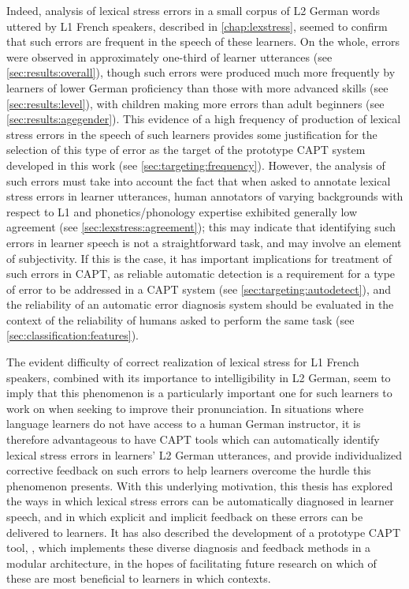  
 Indeed, analysis of lexical stress errors in a small corpus of L2 German words uttered by L1 French speakers, described in \cref{chap:lexstress}, seemed to confirm that such errors are frequent in the speech of these learners. On the whole, errors were observed in approximately one-third of learner utterances (see \cref{sec:results:overall}), though such errors were produced much more frequently by learners of lower German proficiency than those with more advanced skills (see \cref{sec:results:level}), with children making more errors than adult beginners (see \cref{sec:results:agegender}). 
 This evidence of a high frequency of production of lexical stress errors in the speech of such learners provides some justification for the selection of this type of error as the target of the prototype CAPT system developed in this work (see \cref{sec:targeting:frequency}).
 However, the analysis of such errors must take into account the fact that when asked to annotate lexical stress errors in learner utterances, human annotators of varying backgrounds with respect to L1 and phonetics/phonology expertise exhibited generally low agreement (see \cref{sec:lexstress:agreement}); this may indicate that identifying such errors in learner speech is not a straightforward task, and may involve an element of subjectivity. 
 If this is the case, it has important implications for treatment of such errors in CAPT, as reliable automatic detection is a requirement for a type of error to be addressed in a CAPT system (see \cref{sec:targeting:autodetect}), and the reliability of an automatic error diagnosis system should be evaluated in the context of the reliability of humans asked to perform the same task (see \cref{sec:classification:features}).
 
 
 
 
 The evident difficulty of correct realization of lexical stress for L1 French speakers, combined with its importance to intelligibility in L2 German, seem to imply that this phenomenon is a particularly important one for such learners to work on when seeking to improve their pronunciation.
 In situations where language learners do not have access to 
a human German instructor, it is therefore advantageous to have CAPT tools which can automatically identify lexical stress errors in learners' L2 German utterances, and provide individualized corrective feedback on such errors to help learners overcome the hurdle this phenomenon presents. 
%
With this underlying motivation, this thesis has explored the ways in which lexical stress errors can be automatically diagnosed in learner speech, and in which explicit and implicit feedback on these errors can be delivered to learners. It has also described the development of a prototype CAPT tool, , which implements these diverse diagnosis and feedback methods in a modular architecture, in the hopes of facilitating future research on which of these are most beneficial to learners in which contexts.


